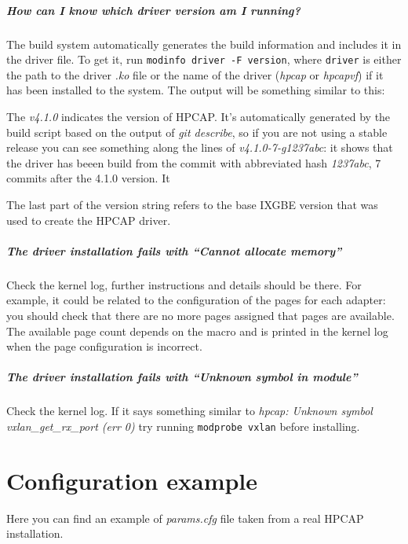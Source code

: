 \documentclass[a4paper,oneside]{hpman}
\begin{document}
\paragraph{How can I know which driver version am I running?}
    The build system automatically generates the build information and includes it in the driver file. To get it, run \texttt{modinfo driver -F version}, where \texttt{driver} is either the path to the driver \textit{.ko} file or the name of the driver (\textit{hpcap} or \textit{hpcapvf}) if it has been installed to the system. The output will be something similar to this:

    \vspace{3pt}
    \vspace{3pt}

    The \textit{v4.1.0} indicates the version of HPCAP. It's automatically generated by the build script based on the output of \textit{git describe}, so if you are not using a stable release you can see something along the lines of \textit{v4.1.0-7-g1237abc}: it shows that the driver has beeen build from the commit with abbreviated hash \textit{1237abc}, 7 commits after the 4.1.0 version. It

    The last part of the version string refers to the base IXGBE version that was used to create the HPCAP driver.

\paragraph{The driver installation fails with ``Cannot allocate memory''}
    Check the kernel log, further instructions and details should be there. For example, it could be related to the configuration of the pages for each adapter: you should check that there are no more pages assigned that pages are available. The available page count depends on the  macro and is printed in the kernel log when the page configuration is incorrect.

\paragraph{The driver installation fails with ``Unknown symbol in module''}
    Check the kernel log. If it says something similar to \textit{hpcap: Unknown symbol vxlan\_get\_rx\_port (err 0)} try running \texttt{modprobe vxlan} before installing.



\appendix
\chapter{Configuration example}
\label{sec:example}

Here you can find an example of \textit{params.cfg} file taken from a real HPCAP installation.

{
}



\nocite{*}


\end{document}
